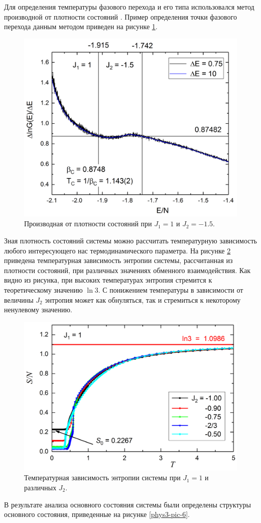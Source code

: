 Для определения температуры фазового перехода и его типа использовался метод производной от плотности состояний \cite{ph3_7}. Пример определения точки фазового перехода данным методом приведен на рисунке \ref{phys3-pic-4}.

\begin{figure}[H]\label{phys3-pic-4}
	\centering
	\includegraphics[width=0.5\linewidth]{content/sections/images/phys3-4}
	\caption{Производная от плотности состояний при $J_1 = 1$ и $J_2 = -1.5$.}
\end{figure}

Зная плотность состояний системы можно рассчитать температурную зависимость любого интересующего нас термодинамического параметра. На рисунке \ref{phys3-pic-5} приведена температурная зависимость энтропии системы, рассчитанная из плотности состояний, при различных значениях обменного взаимодействия. Как видно из рисунка, при высоких температурах энтропия стремится к теоретическому значению $\ln{3}$. С понижением температуры в зависимости от величины $J_2$ энтропия может как обнуляться, так и стремиться к некоторому ненулевому значению.

\begin{figure}[H]	\label{phys3-pic-5}
	\centering
	\includegraphics[width=0.5\linewidth]{content/sections/images/phys3-5}
	\caption{Температурная зависимость энтропии системы при $J_1 = 1$ и различных $J_2$.}
\end{figure}

В результате анализа основного состояния системы были определены структуры основного состояния, приведенные на рисунке \ref{phys3-pic-6}.

